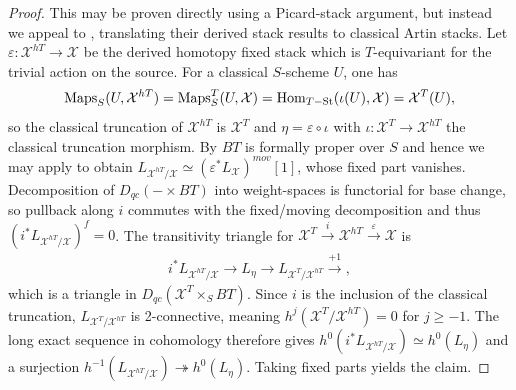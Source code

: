 \documentclass[12pt,dvipsnames]{amsart}
\begin{document}
\begin{proof}
  This may be proven directly using a Picard-stack argument, but instead we appeal to \cite[Cor. A.31]{aranha-khan-latyntsev-etal_VirtualLocalizationRevisited2025}, translating their derived stack results to classical Artin stacks.
  Let \(\varepsilon:\mathcal X^{hT}\to \mathcal X\) be the derived homotopy fixed stack \cite[Def. A.14, Rem A.15]{aranha-khan-latyntsev-etal_VirtualLocalizationRevisited2025} which is \(T\)-equivariant for the trivial action on the source. For a classical \(S\)-scheme \(U\), one has
  \begin{align*}
    \operatorname{Maps}_S(U,\mathcal X^{hT}) = \operatorname{Maps}_S^T(U, \mathcal X) = \operatorname{Hom}_{T-\operatorname{St}}(\iota(U), \mathcal X) = \mathcal X^T(U),
  \end{align*}
  so the classical truncation of \(\mathcal X^{hT}\) is \(\mathcal X^T\) and \(\eta = \varepsilon \circ \iota\) with \(\iota:\mathcal X^T\to \mathcal X^{hT}\) the classical truncation morphism. By \cite[Rem. A.19]{aranha-khan-latyntsev-etal_VirtualLocalizationRevisited2025} \(BT\) is formally proper over \(S\) and hence we may apply \cite[Cor. A.31]{aranha-khan-latyntsev-etal_VirtualLocalizationRevisited2025} to obtain \(L_{\mathcal X^{hT}/\mathcal X}\simeq (\varepsilon^*L_{\mathcal X})^{mov}[1]\), whose fixed part vanishes. Decomposition of \(D_{qc}(-\times BT)\) into weight-spaces is functorial for base change, so pullback along \(i\) commutes with the fixed/moving decomposition and thus \((i^*L_{\mathcal X^{hT}/\mathcal X})^{f} = 0\). The transitivity triangle for \(\mathcal X^T\xrightarrow{i}\mathcal X^{hT}\xrightarrow{\varepsilon}\mathcal X\) is
  \begin{align*}
    i^*L_{\mathcal X^{hT}/\mathcal X} \to L_\eta \to L_{\mathcal X^T/\mathcal X^{hT}} \xrightarrow{+1},
  \end{align*}
  which is a triangle in \(D_{qc}(\mathcal X^{T}\times_SBT)\). Since \(i\) is the inclusion of the classical truncation, \(L_{\mathcal X^T/\mathcal X^{hT}}\) is 2-connective, meaning \(h^j(\mathcal X^T/\mathcal X^{hT}) = 0\) for \(j \geq -1\). The long exact sequence in cohomology therefore gives \(h^0(i^*L_{\mathcal X^{hT}/\mathcal X}) \simeq h^0(L_\eta)\) and a surjection \(h^{-1}(L_{\mathcal X^{hT}/\mathcal X}) \twoheadrightarrow h^0(L_\eta)\). Taking fixed parts yields the claim.
\end{proof}
\end{document}

